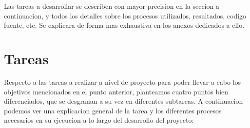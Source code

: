 \documentclass{article}
\begin{document}
Las tareas a desarrollar se describen con mayor precision en la seccion a continuacion, y todos los detalles sobre los procesos utilizados, resultados, codigo fuente, etc. Se explicara de forma mas exhaustiva en los anexos dedicados a ello.




\newpage

\section{Tareas}

Respecto a las tareas a realizar a nivel de proyecto para poder llevar a cabo los objetivos mencionados en el punto anterior, planteamos cuatro puntos bien diferenciados, que se desgranan a su vez en diferentes subtareas. A continuacion podemos ver una explicacion general de la tarea y los diferentes procesos necesarios en su ejecucion a lo largo del desarrollo del proyecto:
\begin{comment}
\begin{itemize}
    \item Realizar un modelo de prueba. Realizar un pequeno proyecto de investigacion implementando un sistema de reconocimiento de caracteres u \textit{OCR}\footnotemark[1] para entender el funcionamiento de estas IA conceptualmente.
    \item Entrenamiento del modelo. A traves de un \textit{dataset}\footnotemark[1] de kanjis de terceros, crear un modelo capaz de reconocer los principales kanji del Japones.
    \item Implementacion del modelo para su uso. Creando una API para poder ejecutar la IA sin necesidad de interactuar con el codigo fuente.
    \item Alojamiento de la API en un servidor. Para poder consumir la API a traves de internet, y por tanto en cualquier dispositivo y en cualquier lugar con conexion a internet.
    \item Creacion de una \textit{GUI}\footnotemark[1]. Creando una interfaz de usuario en Android o PC capaz de capturar imagenes o cargarlas desde memoria y enviarlas para solicitar predicciones a la IA.
\end{itemize}
\end{comment}
\end{document}
